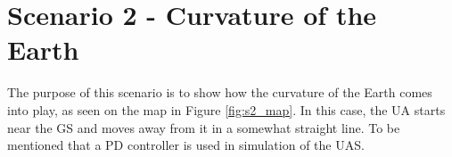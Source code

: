 \newpage
\section{Scenario 2 - Curvature of the Earth}\label{sec:scenario2}
The purpose of this scenario is to show how the curvature of the Earth comes into play, as seen on the map in Figure \ref{fig:s2_map}. In this case, the UA starts near the GS and moves away from it in a somewhat straight line. To be mentioned that a PD controller is used in simulation of the UAS.

\begin{figure}[H]
	\centering

\end{figure}
